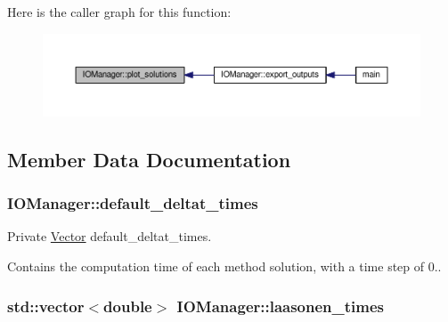 Here is the caller graph for this function\+:
\nopagebreak
\begin{figure}[H]
\begin{center}
\leavevmode
\includegraphics[width=350pt]{classIOManager_a149183e073e33890810fe6801bc4861f_icgraph}
\end{center}
\end{figure}




\subsection{Member Data Documentation}
\subsubsection[{\texorpdfstring{default\+\_\+deltat\+\_\+times}{default_deltat_times}}]{ I\+O\+Manager\+::default\+\_\+deltat\+\_\+times\hspace{0.3cm}{\ttfamily [private]}}\hypertarget{classIOManager_a5551947942fd75911e57b49df6436662}{}\label{classIOManager_a5551947942fd75911e57b49df6436662}


Private \hyperlink{classVector}{Vector} default\+\_\+deltat\+\_\+times. 

Contains the computation time of each method solution, with a time step of 0.. 
\subsubsection[{\texorpdfstring{laasonen\+\_\+times}{laasonen_times}}]{\setlength{\rightskip}{0pt plus 5cm}std\+::vector$<$double$>$ I\+O\+Manager\+::laasonen\+\_\+times\hspace{0.3cm}{\ttfamily [private]}}\hypertarget{classIOManager_a55739efc2d1c63b7b0c0afe2db6b294b}{}\label{classIOManager_a55739efc2d1c63b7b0c0afe2db6b294b}


